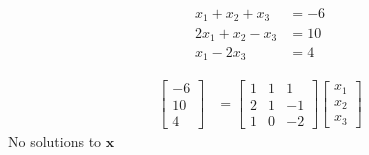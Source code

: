 \begin{align*}
    x_1 + x_2 + x_3 &= -6 \\
    2x_1 + x_2 - x_3 &= 10 \\
    x_1 - 2x_3 &= 4
\end{align*}

\begin{solution}
    \begin{align*}
        \begin{bmatrix}
            -6 \\ 10 \\ 4
        \end{bmatrix} &= \begin{bmatrix}
            1 & 1 & 1 \\
            2 & 1 & -1 \\
            1 & 0 & -2
        \end{bmatrix}\begin{bmatrix}
            x_1 \\ x_2 \\ x_3
        \end{bmatrix}
    \end{align*}
    No solutions to $\boldsymbol{x}$
\end{solution}